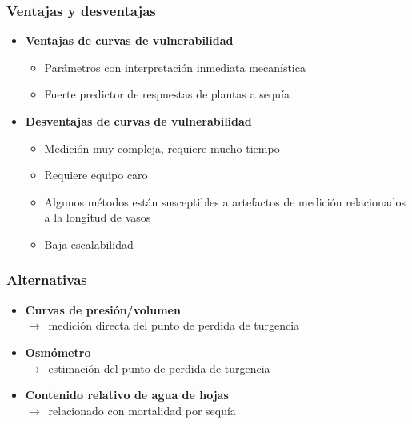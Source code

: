 \documentclass[usepdftitle=false]{beamer}
\newcommand{\Blue}[1]{{\color{blue!50!black}\textbf{#1}}}
\newcommand{\rar}{$\rightarrow$}
\begin{document}
\begin{frame}
	\frametitle{Ventajas y desventajas}
	\begin{itemize}
		\item \textbf{Ventajas de curvas de vulnerabilidad}
		\begin{itemize}			
			\item Parámetros con interpretación inmediata mecanística
			\item Fuerte predictor de respuestas de plantas a sequía 
		\end{itemize}
		\item \textbf{Desventajas de curvas de vulnerabilidad}
		\begin{itemize}
			\item Medición muy compleja, requiere mucho tiempo
			\item Requiere equipo caro
			\item Algunos métodos están susceptibles a artefactos de medición relacionados a la longitud de vasos 
			\item Baja escalabilidad  
		\end{itemize}
	\end{itemize}
\end{frame}

\begin{frame}
	\frametitle{Alternativas}
	\begin{itemize}
		\item \Blue{Curvas de presión/volumen}\\ \rar\ medición directa del punto de perdida de turgencia

		\item \Blue{Osmómetro}\\ \rar\ estimación del punto de perdida de turgencia
		\item \Blue{Contenido relativo de agua de hojas}\\ \rar\ relacionado con mortalidad por sequía
	\end{itemize}
\end{frame}

\end{document}
